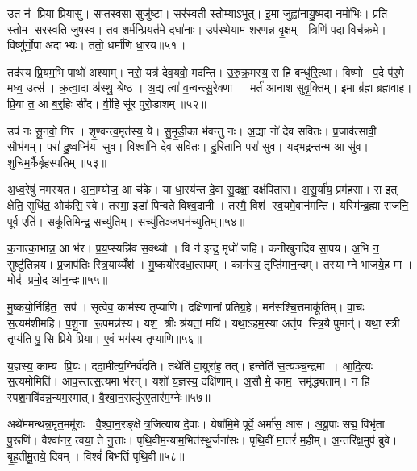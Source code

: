 उ॒त न॑ प्रि॒या प्रि॒यासु॑। स॒प्तस्वसा॒ सुजु॑ष्टा। सर॑स्वती॒ स्तोम्या॑ऽभूत्। इ॒मा जुह्वा॑नायु॒ष्मदा नमो॑भिः। प्रति॒ स्तोम सरस्वति जुषस्व। तव॒ शर्म॑न्प्रि॒यत॑मे॒ दधा॑नाः। उप॑स्थेयाम शर॒णन्न वृ॒क्षम्। त्रिणि॑ प॒दा विच॑क्रमे। विष्णु॑र्गो॒पा अदाभ्यः। ततो॒ धर्मा॑णि धा॒रय\sn{}॥५१॥

तद॑स्य प्रि॒यम॒भि पाथो॑ अश्याम्। नरो॒ यत्र॑ देव॒यवो॒ मद॑न्ति। उ॒रु॒क्र॒मस्य॒ स हि बन्धु॑रि॒त्था। विष्णो प॒दे प॑र॒मे मध्व॒ उत्स॑। क्र॒त्वा॒दा अ॑स्थु॒ श्रेष्ठ॑। अ॒द्य त्वा॑ व॒न्वन्त्सु॒रेक्णा। मर्त॑ आनाश सुवृ॒क्तिम्। इ॒मा ब्र॑ह्म ब्रह्मवाह। प्रि॒या त॒ आ ब॒र्॒हिः सी॑द। वी॒हि सू॑र पुरो॒डाशम्॥५२॥

उप॑ नः सू॒नवो॒ गिर॑। शृ॒ण्वन्त्व॒मृत॑स्य॒ ये। सु॒मृ॒डी॒का भ॑वन्तु नः। अ॒द्या नो॑ देव सवितः। प्र॒जाव॑त्सावी॒ सौभ॑गम्। परा॑ दु॒ष्वप्नि॑य सुव। विश्वा॑नि देव सवितः। दु॒रि॒तानि॒ परा॑ सुव। यद्भ॒द्रन्तन्म॒ आ सु॑व। शुचि॑म॒र्कैर्बृह॒स्पतिम्॥५३॥

अ॒ध्व॒रेषु॑ नमस्यत। अ॒ना॒म्योज॒ आ च॑के। या धा॒रय॑न्त दे॒वा सु॒दक्षा॒ दक्ष॑पितारा। अ॒सु॒र्या॑य॒ प्रम॑हसा। स इत् क्षेति॒ सुधि॑त॒ ओक॑सि॒ स्वे। तस्मा॒ इडा॑ पिन्वते विश्व॒दानी। तस्मै॒ विश॑ स्व॒यमे॒वान॑मन्ति। यस्मि॑न्ब्र॒ह्मा राज॑नि॒ पूर्व॒ एति॑। सकू॑तिमिन्द्र॒ सच्यु॑तिम्। सच्यु॑तिञ्ज॒घन॑च्युतिम्॥५४॥

क॒नात्का॒भान्न॒ आ भ॑र। प्र॒य॒प्स्यन्नि॑व स॒क्थ्यौ। वि न॑ इन्द्र॒ मृधो॑ जहि। कनी॑खुनदिव सा॒पय\sn{}। अ॒भि न॒ सुष्टु॑तिन्नय। प्र॒जाप॑तिः स्त्रि॒याय्यँश॑। मु॒ष्कयो॑रदधा॒त्सपम्। काम॑स्य॒ तृप्ति॑मान॒न्दम्। तस्याग्ने भाजये॒ह मा। मोद॑ प्रमो॒द आ॑न॒न्दः॥५५॥

मु॒ष्कयो॒र्निहि॑त॒ सप॑। सृ॒त्वेव॒ काम॑स्य तृप्याणि। दक्षि॑णानां प्रतिग्र॒हे। मन॑सश्चि॒त्तमाकू॑तिम्। वा॒चः स॒त्यम॑शीमहि। प॒शू॒ना रू॒पमन्न॑स्य। यश॒ श्रीः श्र॑यतां॒ मयि॑। यथा॒ऽहम॒स्या अतृ॑प स्त्रि॒यै पुमान्॑। यथा॒ स्त्री तृप्य॑ति पु॒सि प्रि॒ये प्रि॒या। ए॒वं भग॑स्य तृप्याणि॥५६॥

य॒ज्ञस्य॒ काम्य॑ प्रि॒यः। ददा॒मीत्य॒ग्निर्व॑दति। तथेति॑ वा॒युरा॑ह॒ तत्। हन्तेति॑ स॒त्यञ्च॒न्द्रमा। आ॒दि॒त्यः स॒त्यमोमिति॑। आप॒स्तत्स॒त्यमा भ॑रन्। यशो॑ य॒ज्ञस्य॒ दक्षि॑णाम्। अ॒सौ मे॒ काम॒ समृ॑द्ध्यताम्। न हि स्पश॒मवि॑दन्न॒न्यम॒स्मात्। वै॒श्वा॒न॒रात्पु॑रए॒तार॑म॒ग्नेः॥५७॥

अथे॑ममन्थन्न॒मृत॒ममू॑राः। वै॒श्वा॒न॒रङ्क्षेत्र॒जित्या॑य दे॒वाः। येषा॑मि॒मे पूर्वे॒ अर्मा॑स॒ आस\sn{}। अ॒यू॒पाः सद्म॒ विभृ॑ता पु॒रूणि॑। वैश्वा॑नर॒ त्वया॒ ते नु॒त्ताः। पृ॒थि॒वीम॒न्याम॒भित॑स्थु॒र्जना॑सः। पृ॒थि॒वीं मा॒तरं॑ म॒हीम्। अ॒न्तरि॑क्ष॒मुप॑ ब्रुवे। बृ॒ह॒तीमू॒तये॒ दिवम्। विश्वं॑ बिभर्ति पृथि॒वी॥५८॥

